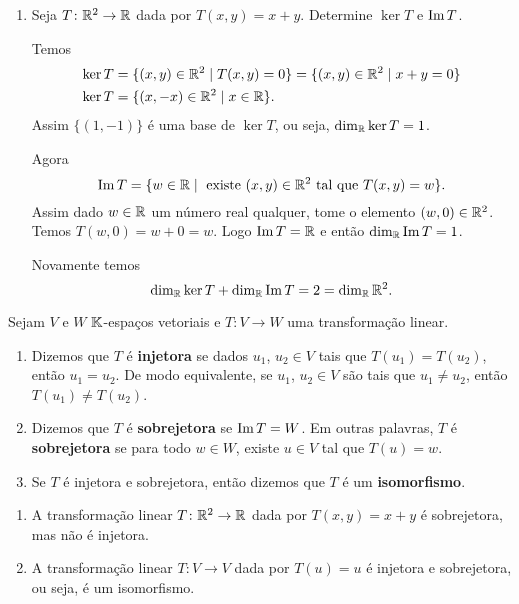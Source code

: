 \begin{exemplos}
\begin{enumerate}[label={\arabic*})]
    \item Seja $T \colon \mathbb{R}^2 \to \mathbb{R}$ dada por $T(x,y) = x + y$. Determine $\ker T$ e ${\rm Im\,} T$.
    \begin{solucao}
      Temos
      \begin{align*}
        \ker T &= \{(x,y) \in \mathbb{R}^2 \mid T(x,y) = 0\} = \{(x,y) \in \mathbb{R}^2 \mid x + y = 0\}\\
        \ker T &= \{(x,-x) \in \mathbb{R}^2 \mid x \in \mathbb{R}\}.
      \end{align*}
      Assim $\{(1,-1)\}$ \'e uma base de $\ker T$, ou seja, $\dim_{\mathbb{R}}\ker T = 1$.

      Agora
      \[
        {\rm Im\,} T = \{w \in \mathbb{R} \mid \mbox{ existe } (x,y) \in \mathbb{R}^2 \mbox{ tal que } T(x,y) = w\}.
      \]
      Assim dado $w \in \mathbb{R}$ um n\'umero real qualquer, tome o elemento $(w,0) \in \mathbb{R}^2$. Temos $T(w,0) = w + 0 = w$. Logo ${\rm Im\,} T = \mathbb{R}$ e ent\~ao $\dim_{\mathbb{R}}{\rm Im\,} T = 1$.

      Novamente temos
      \[
        \dim_{\mathbb{R}}\ker T + \dim_{\mathbb{R}}{\rm Im\,} T = 2 = \dim_{\mathbb{R}}\mathbb{R}^2.
      \]
    \end{solucao}
  \end{enumerate}
\end{exemplos}

\begin{definicao}
  Sejam $V$ e $W$ $\mathbb{K}$-espa\c{c}os vetoriais e $T \colon V \to W$ uma transforma\c{c}\~ao linear.
  \begin{enumerate}[label={\roman*})]
    \item Dizemos que $T$ \'e \textbf{injetora} se dados $u_1$, $u_2 \in V$ tais que $T(u_1) = T(u_2)$, ent\~ao $u_1 = u_2$. De modo equivalente, se $u_1$, $u_2 \in V$ s\~ao tais que $u_1 \ne u_2$, ent\~ao $T(u_1) \ne T(u_2)$.

    \item Dizemos que $T$ \'e \textbf{sobrejetora} se ${\rm Im\,} T = W$. Em outras palavras, $T$ \'e \textbf{sobrejetora} se para todo $w \in W$, existe $u \in V$ tal que $T(u) = w$.

    \item Se $T$ \'e injetora e sobrejetora, ent\~ao dizemos que $T$ \'e um \textbf{isomorfismo}.
  \end{enumerate}
\end{definicao}

\begin{exemplos}
  \begin{enumerate}[label={\arabic*})]
    \item A transforma\c{c}\~ao linear $T \colon \mathbb{R}^2 \to \mathbb{R}$ dada por $T(x,y) = x + y$ \'e sobrejetora, mas n\~ao \'e injetora.

    \item A transforma\c{c}\~ao linear $T \colon V \to V$ dada por $T(u) = u$ \'e injetora e sobrejetora, ou seja, \'e um isomorfismo.
  \end{enumerate}
\end{exemplos}

